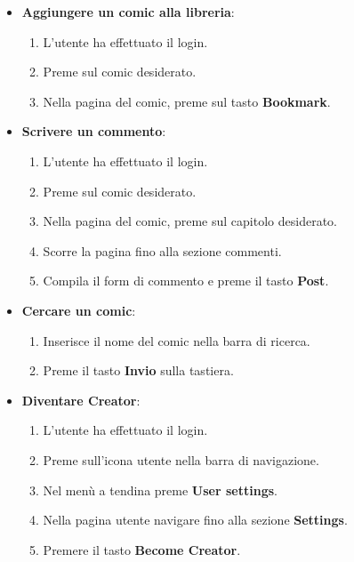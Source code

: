 \begin{itemize}
  \item \textbf{Aggiungere un comic alla libreria}:
        \begin{enumerate}
          \item L'utente ha effettuato il login.
          \item Preme sul comic desiderato.
          \item Nella pagina del comic, preme sul tasto \textbf{Bookmark}.
        \end{enumerate}

  \item \textbf{Scrivere un commento}:
        \begin{enumerate}
          \item L'utente ha effettuato il login.
          \item Preme sul comic desiderato.
          \item Nella pagina del comic, preme sul capitolo desiderato.
          \item Scorre la pagina fino alla sezione commenti.
          \item Compila il form di commento e preme il tasto \textbf{Post}.
        \end{enumerate}

  \item \textbf{Cercare un comic}:
        \begin{enumerate}
          \item Inserisce il nome del comic nella barra di ricerca.
          \item Preme il tasto \textbf{Invio} sulla tastiera.
        \end{enumerate}

  \item \textbf{Diventare Creator}:
        \begin{enumerate}
          \item L'utente ha effettuato il login.
          \item Preme sull'icona utente nella barra di navigazione.
          \item Nel menù a tendina preme \textbf{User settings}.
          \item Nella pagina utente navigare fino alla sezione \textbf{Settings}.
          \item Premere il tasto \textbf{Become Creator}.
        \end{enumerate}


\end{itemize}
